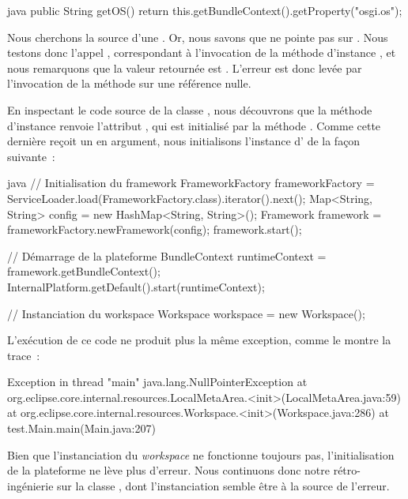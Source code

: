 \begin{imtaCode}{java}
public String getOS() {
    return this.getBundleContext().getProperty("osgi.os");
}
\end{imtaCode}

Nous cherchons la source d'une .
Or, nous savons que  ne pointe pas sur .
Nous testons donc l'appel , correspondant à l'invocation de la méthode d'instance %
, et nous remarquons que la valeur retournée est .
L'erreur  est donc levée par l'invocation de la méthode  sur une référence nulle.

En inspectant le code source de la classe , nous découvrons que la méthode d'instance  renvoie l'attribut , %
qui est initialisé par la méthode .
Comme cette dernière reçoit un  en argument, nous initialisons l'instance d' de la façon suivante~:

\begin{imtaCode}{java}
// Initialisation du framework
FrameworkFactory frameworkFactory = ServiceLoader.load(FrameworkFactory.class).iterator().next();
Map<String, String> config = new HashMap<String, String>();
Framework framework = frameworkFactory.newFramework(config);
framework.start();

// Démarrage de la plateforme
BundleContext runtimeContext = framework.getBundleContext();
InternalPlatform.getDefault().start(runtimeContext);

// Instanciation du workspace
Workspace workspace = new Workspace();
\end{imtaCode}

L'exécution de ce code ne produit plus la même exception, comme le montre la trace~:

\begin{imtaConsole}
Exception in thread "main" java.lang.NullPointerException
	at org.eclipse.core.internal.resources.LocalMetaArea.<init>(LocalMetaArea.java:59)
	at org.eclipse.core.internal.resources.Workspace.<init>(Workspace.java:286)
	at test.Main.main(Main.java:207)
\end{imtaConsole}

Bien que l'instanciation du \textit{workspace} ne fonctionne toujours pas, l'initialisation de la plateforme ne lève plus d'erreur.
Nous continuons donc notre rétro-ingénierie sur la classe , dont l'instanciation semble être à la source de l'erreur.


